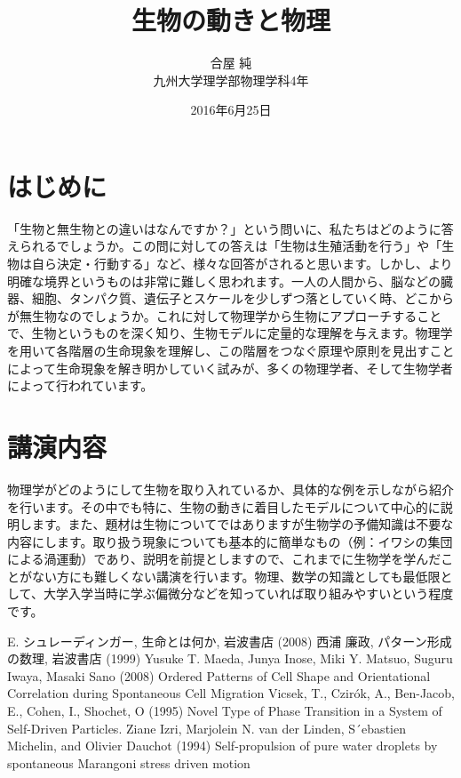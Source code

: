 \documentclass[12pt]{jsarticle}
\title{生物の動きと物理}%
\author{合屋 純\\%
{\small
九州大学理学部物理学科4年　%
}}
\date{2016年6月25日}%
\begin{document}
\maketitle
\thispagestyle{fancy}
\section{はじめに}
「生物と無生物との違いはなんですか？」という問いに、私たちはどのように答えられるでしょうか。この問に対しての答えは「生物は生殖活動を行う」や「生物は自ら決定・行動する」など、様々な回答がされると思います。しかし、より明確な境界というものは非常に難しく思われます。一人の人間から、脳などの臓器、細胞、タンパク質、遺伝子とスケールを少しずつ落としていく時、どこからが無生物なのでしょうか。これに対して物理学から生物にアプローチすることで、生物というものを深く知り、生物モデルに定量的な理解を与えます。物理学を用いて各階層の生命現象を理解し、この階層をつなぐ原理や原則を見出すことによって生命現象を解き明かしていく試みが、多くの物理学者、そして生物学者によって行われています。
\section{講演内容}
物理学がどのようにして生物を取り入れているか、具体的な例を示しながら紹介を行います。その中でも特に、生物の動きに着目したモデルについて中心的に説明します。また、題材は生物についてではありますが生物学の予備知識は不要な内容にします。取り扱う現象についても基本的に簡単なもの（例：イワシの集団による渦運動）であり、説明を前提としますので、これまでに生物学を学んだことがない方にも難しくない講演を行います。物理、数学の知識としても最低限として、大学入学当時に学ぶ偏微分などを知っていれば取り組みやすいという程度です。
\begin{thebibliography}{9}%
\bibitem{}E. シュレーディンガー, 生命とは何か, 岩波書店 (2008)
\bibitem{}西浦 廉政, パターン形成の数理, 岩波書店 (1999)
\bibitem{}Yusuke T. Maeda, Junya Inose, Miki Y. Matsuo, Suguru Iwaya, Masaki Sano (2008) Ordered Patterns of Cell Shape and Orientational Correlation during Spontaneous Cell Migration
\bibitem{}Vicsek, T., Czirók, A., Ben-Jacob, E., Cohen, I., Shochet, O (1995) Novel Type of Phase Transition in a System of Self-Driven Particles. 
\bibitem{}Ziane Izri, Marjolein N. van der Linden, S´ebastien Michelin, and Olivier Dauchot (1994) Self-propulsion of pure water droplets by spontaneous Marangoni stress driven motion 
\end{thebibliography}
\end{document}
